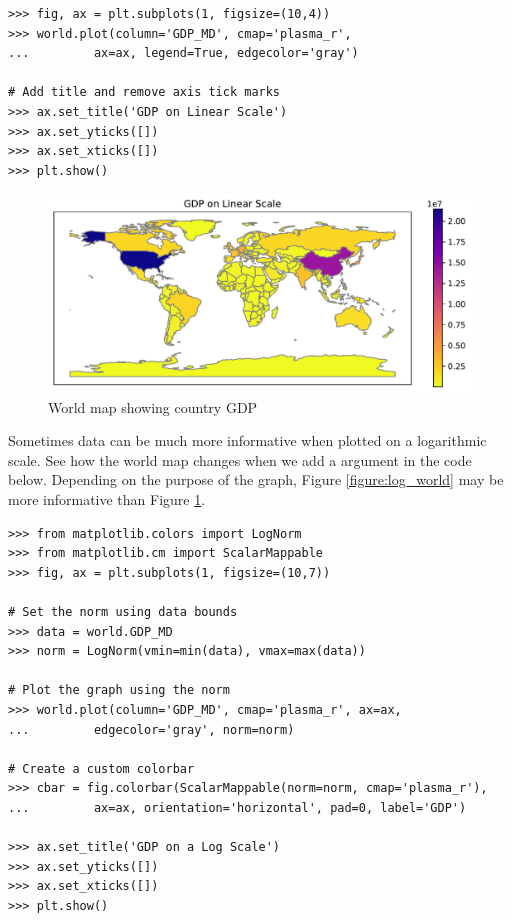 \begin{lstlisting}
>>> fig, ax = plt.subplots(1, figsize=(10,4))
>>> world.plot(column='GDP_MD', cmap='plasma_r',
...			ax=ax, legend=True, edgecolor='gray')

# Add title and remove axis tick marks
>>> ax.set_title('GDP on Linear Scale')
>>> ax.set_yticks([])
>>> ax.set_xticks([])
>>> plt.show()
\end{lstlisting}

\begin{figure}[H]
\begin{center}
\includegraphics[scale=.7]{figures/world_linear.pdf}
\end{center}
\caption{World map showing country GDP}
\label{figure:linear_world}
\end{figure}

Sometimes data can be much more informative when plotted on a logarithmic scale.
See how the world map changes when we add a  argument in the code below.
Depending on the purpose of the graph, Figure \ref{figure:log_world} may be more informative than Figure \ref{figure:linear_world}.

\begin{lstlisting}
>>> from matplotlib.colors import LogNorm
>>> from matplotlib.cm import ScalarMappable
>>> fig, ax = plt.subplots(1, figsize=(10,7))

# Set the norm using data bounds
>>> data = world.GDP_MD
>>> norm = LogNorm(vmin=min(data), vmax=max(data))

# Plot the graph using the norm
>>> world.plot(column='GDP_MD', cmap='plasma_r', ax=ax,
...			edgecolor='gray', norm=norm)

# Create a custom colorbar
>>> cbar = fig.colorbar(ScalarMappable(norm=norm, cmap='plasma_r'),
...			ax=ax, orientation='horizontal', pad=0, label='GDP')

>>> ax.set_title('GDP on a Log Scale')
>>> ax.set_yticks([])
>>> ax.set_xticks([])
>>> plt.show()
\end{lstlisting}

